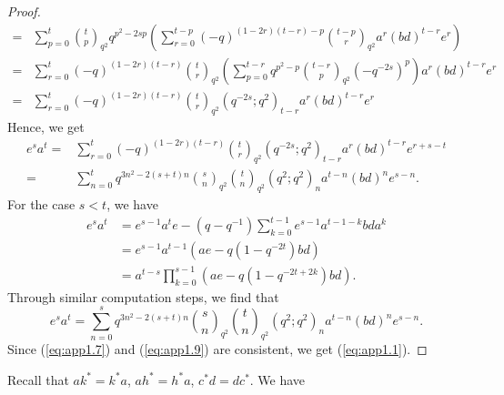 \documentclass[table,a4paper,reqno]{amsart}
\numberwithin{equation}{section}
\theoremstyle{definition}
\begin{document}
\begin{proof}
\begin{equation}
\begin{split}
            =&\sum_{p=0}^t{t\choose p}_{q^2}q^{p^2-2sp}\left(\sum_{r=0}^{t-p}(-q)^{(1-2r)(t-r)-p}{t-p\choose r}_{q^2}a^r(bd)^{t-r}e^r\right)\\
            =&\sum_{r=0}^t(-q)^{(1-2r)(t-r)}{t\choose r}_{q^2}\left(\sum_{p=0}^{t-r}q^{p^2-p}{t-r\choose p}_{q^2}(-q^{-2s})^p\right)a^r(bd)^{t-r}e^r\\
            =&\sum_{r=0}^t(-q)^{(1-2r)(t-r)}{t\choose r}_{q^2}(q^{-2s};q^2)_{t-r}a^r(bd)^{t-r}e^r
        \end{split}
    \end{equation}
    Hence, we get
    \begin{equation}\label{eq:app1.7}
        \begin{split}
            e^sa^t=&\sum_{r=0}^t(-q)^{(1-2r)(t-r)}{t\choose r}_{q^2}(q^{-2s};q^2)_{t-r}a^r(bd)^{t-r}e^{r+s-t}\\
            =&\sum_{n=0}^{t}q^{3n^2-2(s+t)n}{s\choose n}_{q^2}{t\choose n}_{q^2}(q^2;q^2)_na^{t-n}(bd)^{n}e^{s-n}.
        \end{split}
    \end{equation}
     For the case $s<t$, we have
    \begin{equation}
        \begin{split}
            e^sa^t&=e^{s-1}a^te-(q-q^{-1})\sum_{k=0}^{t-1}e^{s-1}a^{t-1-k}bda^{k}\\
            &=e^{s-1}a^{t-1}(ae-q(1-q^{-2t})bd)\\
            &=a^{t-s}\prod_{k=0}^{s-1}(ae-q(1-q^{-2t+2k})bd).
        \end{split}
    \end{equation}
    Through similar computation steps, we find that
    \begin{equation}\label{eq:app1.9}
        e^sa^t=\sum_{n=0}^{s}q^{3n^2-2(s+t)n}{s\choose n}_{q^2}{t\choose n}_{q^2}(q^2;q^2)_na^{t-n}(bd)^{n}e^{s-n}.
    \end{equation}
    Since (\ref{eq:app1.7}) and (\ref{eq:app1.9}) are consistent, we get (\ref{eq:app1.1}).
\end{proof}
Recall that $ak^*=k^*a$, $ah^*=h^*a$, $c^*d=dc^*$. We have
\end{document}
